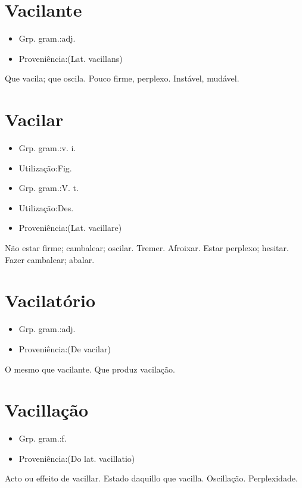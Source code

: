 \documentclass{article}
\begin{document}
\section{Vacilante}
\begin{itemize}
\item {Grp. gram.:adj.}
\end{itemize}
\begin{itemize}
\item {Proveniência:(Lat. \textunderscore vacillans\textunderscore )}
\end{itemize}
Que vacila; que oscila.
Pouco firme, perplexo.
Instável, mudável.
\section{Vacilar}
\begin{itemize}
\item {Grp. gram.:v. i.}
\end{itemize}
\begin{itemize}
\item {Utilização:Fig.}
\end{itemize}
\begin{itemize}
\item {Grp. gram.:V. t.}
\end{itemize}
\begin{itemize}
\item {Utilização:Des.}
\end{itemize}
\begin{itemize}
\item {Proveniência:(Lat. \textunderscore vacillare\textunderscore )}
\end{itemize}
Não estar firme; cambalear; oscilar.
Tremer.
Afroixar.
Estar perplexo; hesitar.
Fazer cambalear; abalar.
\section{Vacilatório}
\begin{itemize}
\item {Grp. gram.:adj.}
\end{itemize}
\begin{itemize}
\item {Proveniência:(De \textunderscore vacilar\textunderscore )}
\end{itemize}
O mesmo que \textunderscore vacilante\textunderscore .
Que produz vacilação.
\section{Vacillação}
\begin{itemize}
\item {Grp. gram.:f.}
\end{itemize}
\begin{itemize}
\item {Proveniência:(Do lat. \textunderscore vacillatio\textunderscore )}
\end{itemize}
Acto ou effeito de vacillar.
Estado daquillo que vacilla.
Oscillação.
Perplexidade.
\end{document}
